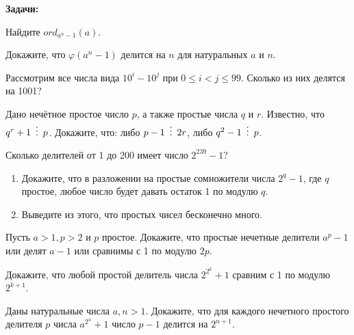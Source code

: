 \documentclass{article}
\begin{document}
    \textbf{Задачи:}

    \begin{enumerate_boxed}

        \item Найдите $ord_{a^n-1}(a).$

        \item Докажите, что $ \varphi(a^n - 1) $ делится на $ n $ для натуральных $ a $ и $ n $.

        \item Рассмотрим все числа вида $10^i - 10^j$ при $0 \leqslant i < j \leqslant 99$.
        Сколько из них делятся
        на 1001?

        \item Дано нечётное простое число $p$, а также простые числа $q$ и $r$.
        Известно, что
        $q^r +1 \,\,\,\vdots\,\,\, p$.
        Докажите, что: либо $p - 1 \,\,\,\vdots\,\,\, 2r$, либо $q^2- 1 \,\,\,\vdots\,\,\, p$.

        \item Сколько делителей от 1 до 200 имеет число $2^{239} - 1$?

        \item
        \begin{enumerate}

            \item Докажите, что в разложении на простые сомножители числа $2^q -1$, где $ q $ простое, любое число будет давать остаток 1 по модулю $ q $.

            \item Выведите из этого, что простых чисел бесконечно много.

        \end{enumerate}

        \item Пусть $a > 1, p > 2$ и $ p $ простое.
        Докажите, что простые нечетные делители $ a^p - 1 $ или делят $ a - 1 $ или сравнимы с 1 по модулю $ 2p $.

        \item Докажите, что любой простой делитель числа $ 2^{2^k} + 1 $ сравним с 1 по модулю $ 2^{k + 1} $.

        \item Даны натуральные числа $a, n > 1$.
        Докажите, что для каждого нечетного простого делителя $ p $ числа $ a^{2^n} + 1 $ число $ p - 1 $ делится на $ 2^{n+1} $.


\end{enumerate_boxed}
\end{document}
